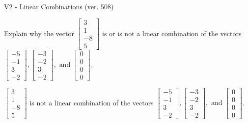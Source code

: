 \begin{exercise}
  \begin{exerciseTitle}V2 - Linear Combinations (ver. 508)\end{exerciseTitle}
  \begin{exerciseStatement}
    Explain why the vector \(\left[\begin{array}{c}
3 \\
1 \\
-8 \\
5
\end{array}\right]\)  is or is not a linear 
	combination of the vectors \(\left[\begin{array}{c}
-5 \\
-1 \\
3 \\
-2
\end{array}\right] , \left[\begin{array}{c}
-3 \\
-2 \\
3 \\
-2
\end{array}\right] , \text{ and } \left[\begin{array}{c}
0 \\
0 \\
0 \\
0
\end{array}\right]\).
	


  \end{exerciseStatement}
  \begin{exerciseAnswer}
   \(\left[\begin{array}{c}
3 \\
1 \\
-8 \\
5
\end{array}\right]\) 
  	 is not  
	a linear combination of the vectors \(\left[\begin{array}{c}
-5 \\
-1 \\
3 \\
-2
\end{array}\right] , \left[\begin{array}{c}
-3 \\
-2 \\
3 \\
-2
\end{array}\right] , \text{ and } \left[\begin{array}{c}
0 \\
0 \\
0 \\
0
\end{array}\right]\).

	
  


  \end{exerciseAnswer}
\end{exercise}